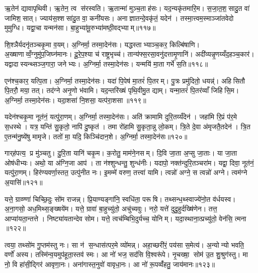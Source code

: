 ऋ॒तेन॑ द्यावापृथिवी। ऋ॒तेन॒ त्व स॑रस्वति। ऋ॒तान्मा॑ मुञ्च॒ताह॑सः। यद॒न्यकृ॑तमारि॒म। स॒जा॒त॒श॒सादु॒त वा॑ जामिश॒सात्। ज्याय॑स॒श्शसा॑दु॒त वा॒ कनी॑यसः। अनाज्ञातन्दे॒वकृ॑तं॒ यदेन॑। तस्मा॒त्त्वम॒स्माञ्जा॑तवेदो मुमुग्धि। यद्वा॒चा यन्मन॑सा। बा॒हुभ्या॑मू॒रुभ्या॑मष्ठी॒वद्भ्याम्॥११७॥

शि॒श्ञैर्यदनृ॑तञ्चकृ॒मा व॒यम्। अ॒ग्निर्मा॒ तस्मा॒देन॑सः। यद्धस्ताभ्याञ्च॒कर॒ किल्बि॑षाणि। अ॒ख्षाणाव्वँ॒ग्नुमु॑प॒जिघ्न॑मानः। दू॒रे॒प॒श्या च॑ राष्ट्र॒भृच्च॑। तान्य॑फ्स॒रसा॒वनु॑दत्तामृ॒णानि॑। अदी॑व्यन्नृ॒णय्यँद॒हञ्च॒कार॑। यद्वादास्यन्थ्सञ्ज॒गारा॒ जनेभ्यः। अ॒ग्निर्मा॒ तस्मा॒देन॑सः। यन्मयि॑ मा॒ता गर्भे॑ स॒ति॥११८॥

एन॑श्च॒कार॒ यत्पि॒ता। अ॒ग्निर्मा॒ तस्मा॒देन॑सः। यदा॑ पि॒पेष॑ मा॒तरं॑ पि॒तरम्। पु॒त्रः प्रमु॑दितो॒ धयन्न्॑। अहिसितौ पि॒तरौ॒ मया॒ तत्। तद॑ग्ने अनृ॒णो भ॑वामि। यद॒न्तरि॑ख्षं पृथि॒वीमु॒त द्याम्। यन्मा॒तरं॑ पि॒तर॑व्वाँ जिहिसि॒म। अ॒ग्निर्मा॒ तस्मा॒देन॑सः। यदा॒शसा॑ नि॒शसा॒ यत्प॑रा॒शसा॥११९॥

यदेन॑श्चकृ॒मा नूत॑नं॒ यत्पु॑रा॒णम्। अ॒ग्निर्मा॒ तस्मा॒देन॑सः। अति॑ क्रामामि दुरि॒तय्यँदेन॑। जहा॑मि रि॒प्रं प॑र॒मे स॒धस्थे। यत्र॒ यन्ति॑ सु॒कृतो॒ नापि॑ दु॒ष्कृत॑। तमा रो॑हामि सु॒कृता॒न्नु लो॒कम्। त्रि॒ते दे॒वा अ॑मृजतै॒तदेन॑। त्रि॒त ए॒तन्म॑नु॒ष्ये॑षु मामृजे। ततो॑ मा॒ यदि॒ किञ्चि॑दान॒शे। अ॒ग्निर्मा॒ तस्मा॒देन॑सः॥१२०॥

गार्‌ह॑पत्य॒ प्र मु॑ञ्चतु। दु॒रि॒ता यानि॑ चकृ॒म। क॒रोतु॒ माम॑ने॒नसम्। दि॒वि जा॒ता अ॒प्सु जा॒ताः। या जा॒ता ओष॑धीभ्यः। अथो॒ या अ॑ग्नि॒जा आप॑। ता न॑श्शुन्धन्तु॒ शुन्ध॑नीः। यदापो॒ नक्त॑न्दुरि॒तञ्चरा॑म। यद्वा॒ दिवा॒ नूत॑नं॒ यत्पु॑रा॒णम्। हिर॑ण्यवर्णा॒स्तत॒ उत्पु॑नीत नः। इ॒मम्मे॑ वरुण॒ तत्त्वा॑ यामि। त्वन्नो॑ अग्ने॒ स त्वन्नो॑ अग्ने। त्वम॑ग्ने अ॒यासि॑॥१२१॥\anuvakamend[अ॒ने॒नस॑मष्ठी॒वद्भ्या स॒ति प॑रा॒शसा॑ऽऽन॒शेऽग्निर्मा॒ तस्मा॒देन॑सः पुनीत न॒स्त्रीणि॑ च (यद्दे॑वा॒ देवा॑ ऋ॒तेन॑ सजातश॒साद्यद्वा॒चा यद्धस्ताभ्या॒मदीव्यं॒ यन्मयि॑ मा॒ता यदा॑ पि॒पेष॒ यद॒न्तरि॑ख्षं॒ यदा॒शसाऽति॑ क्रामामि त्रि॒ते दे॒वा दि॒वि जा॒ता अ॒प्सु जा॒ता यदाप॑ इ॒मम्मे॑ वरुण॒ तत्त्वा॑ यामि॒ त्वन्नो॑ अग्ने॒ स त्वन्नो॑ अग्ने॒ त्वम॑ग्ने अ॒यासि॑। )]

यत्ते॒ ग्राव्ण्णा॑ चिच्छि॒दुः सो॑म राजन्न्। प्रि॒याण्यङ्गा॑नि॒ स्वधि॑ता॒ परूषि। तथ्सन्ध॒थ्स्वाज्ये॑नो॒त व॑र्धयस्व। अ॒ना॒गसो॒ अध॒मिथ्स॒ङ्ख्षये॑म। यत्ते॒ ग्रावा॑ बा॒हुच्यु॑तो॒ अचु॑च्यवुः। नरो॒ यत्ते॑ दुदु॒हुर्दख्षि॑णेन। तत्त॒ आप्या॑यता॒न्तत्ते। निष्ट्या॑यतान्देव सोम। यत्ते॒ त्वच॑म्बिभि॒दुर्यच्च॒ योनिम्। यदा॒स्थाना॒त्प्रच्यु॑तो॒ वेन॑सि॒ त्मना ॥१२२॥

त्वया॒ तथ्सो॑म गु॒प्तम॑स्तु नः। सा न॑ स॒न्धास॑त्पर॒मे व्यो॑मन्न्। अहा॒च्छरी॑रं॒ पय॑सा स॒मेत्य॑। अ॒न्योन्यो भवति॒ वर्णो॑ अस्य। तस्मि॑न्व॒यमुप॑हूता॒स्तव॑ स्मः। आ नो॑ भज॒ सद॑सि वि॒श्वरू॑पे। नृ॒चख्षा॒ सोम॑ उ॒त शु॒श्रुग॑स्तु। मा नो॒ वि हा॑सी॒द्गिर॑ आवृणा॒नः। अना॑गास्त॒नुवो॑ वावृधा॒नः। आ नो॑ रू॒पव्वँ॑हतु॒ जाय॑मानः॥१२३॥

